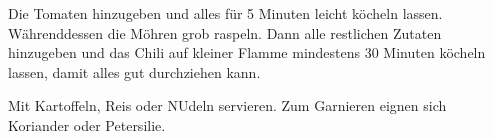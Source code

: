 \begin{recipeDP}
{        \step Die Tomaten hinzugeben und alles für 5 Minuten leicht köcheln lassen.
        Währenddessen die Möhren grob raspeln.
        Dann alle restlichen Zutaten hinzugeben und das Chili auf kleiner Flamme mindestens 30 Minuten köcheln lassen, damit alles gut durchziehen kann.

        \step Mit Kartoffeln, Reis oder NUdeln servieren. Zum Garnieren eignen sich Koriander oder Petersilie.
    }

		


\end{recipeDP}